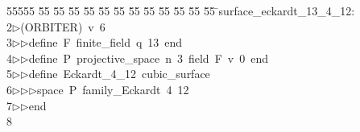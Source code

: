 %
%
\begin{tabbing}
55555 \= 55 \= 55 \= 55 \= 55 \= 55 \= 55 \= 55 \= 55 \= 55 \= 55 \= 55 \= 55 \= \>surface\_eckardt\_13\_4\_12:\\[0pt]
2\>$\triangleright$\>(ORBITER)\ v\ 6\ \\[0pt]
3\>$\triangleright$\>$\triangleright$\>define\ F\ finite\_field\ q\ 13\ end\ \\[0pt]
4\>$\triangleright$\>$\triangleright$\>define\ P\ projective\_space\ n\ 3\ field\ F\ v\ 0\ end\ \\[0pt]
5\>$\triangleright$\>$\triangleright$\>define\ Eckardt\_4\_12\ cubic\_surface\ \\[0pt]
6\>$\triangleright$\>$\triangleright$\>$\triangleright$\>space\ P\ family\_Eckardt\ 4\ 12\ \\[0pt]
7\>$\triangleright$\>$\triangleright$\>end\\[0pt]
8\>\end{tabbing}
